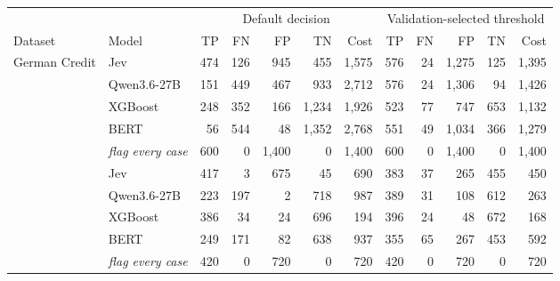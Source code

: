 \begin{tabular}{llrrrrrrrrrr}
\toprule
 & & \multicolumn{5}{c}{Default decision} & \multicolumn{5}{c}{Validation-selected threshold} \\
\cmidrule(lr){3-7}\cmidrule(lr){8-12}
Dataset & Model & TP & FN & FP & TN & Cost & TP & FN & FP & TN & Cost \\
\midrule
\multirow{5}{*}{German Credit} & Jev & 474 & 126 & 945 & 455 & 1{,}575 & 576 & 24 & 1{,}275 & 125 & 1{,}395 \\
 & Qwen3.6-27B & 151 & 449 & 467 & 933 & 2{,}712 & 576 & 24 & 1{,}306 & 94 & 1{,}426 \\
 & XGBoost & 248 & 352 & 166 & 1{,}234 & 1{,}926 & 523 & 77 & 747 & 653 & 1{,}132 \\
 & BERT & 56 & 544 & 48 & 1{,}352 & 2{,}768 & 551 & 49 & 1{,}034 & 366 & 1{,}279 \\
 & \emph{flag every case} & 600 & 0 & 1{,}400 & 0 & 1{,}400 & 600 & 0 & 1{,}400 & 0 & 1{,}400 \\
\addlinespace
\multirow{5}{*}{Breast Cancer Wisconsin} & Jev & 417 & 3 & 675 & 45 & 690 & 383 & 37 & 265 & 455 & 450 \\
 & Qwen3.6-27B & 223 & 197 & 2 & 718 & 987 & 389 & 31 & 108 & 612 & 263 \\
 & XGBoost & 386 & 34 & 24 & 696 & 194 & 396 & 24 & 48 & 672 & 168 \\
 & BERT & 249 & 171 & 82 & 638 & 937 & 355 & 65 & 267 & 453 & 592 \\
 & \emph{flag every case} & 420 & 0 & 720 & 0 & 720 & 420 & 0 & 720 & 0 & 720 \\
\bottomrule
\end{tabular}
